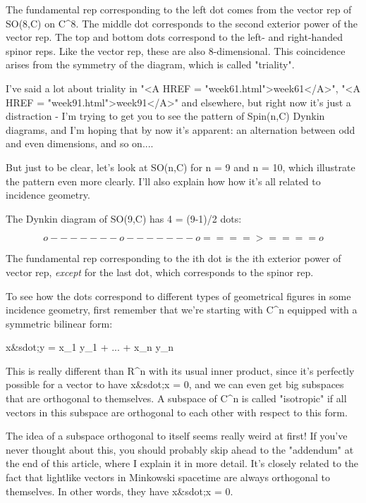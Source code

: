 The fundamental rep corresponding to the left dot comes from
the vector rep of SO(8,C) on C^{8}.  The middle dot corresponds
to the second exterior power of the vector rep.  The top and
bottom dots correspond to the left- and right-handed spinor reps.
Like the vector rep, these are also 8-dimensional.  This coincidence
arises from the symmetry of the diagram, which is called "triality".

I've said a lot about triality 
in "<A HREF = "week61.html">week61</A>", 
"<A HREF = "week91.html">week91</A>" and elsewhere,
but right now it's just a distraction - I'm trying to get you to
see the pattern of Spin(n,C) Dynkin diagrams, and I'm hoping that
by now it's apparent: an alternation between odd and even dimensions,
and so on....

But just to be clear, let's look at SO(n,C) for n = 9 and n = 10, which 
illustrate the pattern even more clearly.   I'll also explain how
how it's all related to incidence geometry.

The Dynkin diagram of SO(9,C) has 4 = (9-1)/2 dots:



$$

                 o-------o-------o====>====o 
$$
    
The fundamental rep corresponding to the ith dot is the
ith exterior power of vector rep, \emph{except} for the last dot, 
which corresponds to the spinor rep.  

To see how the dots correspond to different types of geometrical figures
in some incidence geometry, first remember that we're starting with 
C^{n} equipped with a symmetric bilinear form:

x&sdot;y = x_{1} y_{1} + ... + x_{n} y_{n}

This is really different than R^{n} with its usual inner product, since
it's perfectly possible for a vector to have x&sdot;x = 0, and we can even
get big subspaces that are orthogonal to themselves.  A subspace of 
C^{n} is called "isotropic" if all vectors in this 
subspace are orthogonal to 
each other with respect to this form.  


The idea of a subspace orthogonal to itself seems really weird at first!
If you've never thought about this, you should probably skip ahead to
the "addendum" at the end of this article, where I explain it in more
detail.  It's closely related to the fact that lightlike vectors in
Minkowski spacetime are always orthogonal to themselves.  In other
words, they have x&sdot;x = 0.

